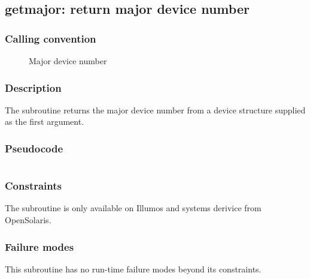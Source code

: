 \clearpage
{}
{}
\label{subr:getmajor}
\subsection*{getmajor: return major device number}

\subsubsection*{Calling convention}

\begin{description}
\item[] Major device number
\end{description}

\subsubsection*{Description}

The  subroutine returns the major device number
from a device structure supplied as the first argument.

\subsubsection*{Pseudocode}

\begin{verbatim}
\end{verbatim}

\subsubsection*{Constraints}

The  subroutine is only available on Illumos and
systems derivice from OpenSolaris.

\subsubsection*{Failure modes}

This subroutine has no run-time failure modes beyond its constraints.
